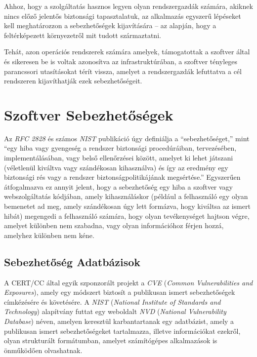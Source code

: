 	Ahhoz, hogy a szolgáltatás hasznos legyen olyan rendszergazdák számára, akiknek nincs előző jelentős biztonsági tapasztalatuk, az alkalmazás egyszerű lépéseket kell meghatározzon a sebezhetőségek kijavítására -- az alapján, hogy a feltérképezett környezetről mit tudott származtatni.

	Tehát, azon operációs rendszerek számára amelyek, támogatottak a szoftver által és sikeresen be is voltak azonosítva az infrastruktúrában, a szoftver tényleges parancssori utasításokat térít vissza, amelyet a rendszergazdák lefuttatva a cél rendszeren kijavíthatják ezek sebezhetőségeit.
	
\section*{Szoftver Sebezhetőségek}
	
	Az \textit{RFC 2828} és számos \textit{NIST} publikáció úgy definiálja a ``sebezhetőséget,'' mint ``egy hiba vagy gyengeség a rendszer biztonsági procedúráiban, tervezésében, implementálásában, vagy belső ellenőrzései között, amelyet ki lehet játszani (véletlenül kiváltva vagy szándékosan kihasználva) és így az eredmény egy biztonsági rés vagy a rendszer biztonságpolitikájának megsértése.''\cite{rfc2828,nist80030} Egyszerűen átfogalmazva ez annyit jelent, hogy a sebezhetőség egy hiba a szoftver vagy webszolgáltatás kódjában, amely kihasználáskor (például a felhasználó egy olyan bemenetet ad meg, amely szándékosan úgy lett formázva, hogy kiváltsa az ismert hibát) megengedi a felhasználó számára, hogy olyan tevékenységet hajtson végre, amelyet különben nem szabadna, vagy olyan információhoz férjen hozzá, amelyhez különben nem kéne.
	
\subsection*{Sebezhetőség Adatbázisok}
	
	A CERT/CC által egyik szponzorált projekt a \textit{CVE} (\textit{Common Vulnerabilities and Exposures}), amely egy módszert biztosít a publikusan ismert sebezhetőségek címkézésére és követésére. A \textit{NIST} (\textit{National Institute of Standards and Technology}) alapítvány futtat egy weboldalt \textit{NVD} (\textit{National Vulnerability Database}) néven, amelyen keresztül karbantartanak egy adatbázist, amely a publikusan ismert sebezhetőségeket tartalmazza, illetve információkat ezekről, olyan strukturált formátumban, amelyet számítógépes alkalmazások is önműködően olvashatnak\cite{nvd15}.
	
